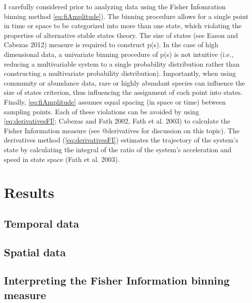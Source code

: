 \documentclass[12pt,twoside]{reedthesis}
\begin{document}
I carefully considered prior to analyzing data using the Fisher
Infomration binning method \eqref{eq:fiAmplitude}). The binning procedure
allows for a single point in time or space to be categorized into more
than one state, which violating the properties of alternative stable
states theory. The size of states (see Eason and Cabezas 2012) measure
is required to construct p(s). In the case of high dimensional data, a
univariate binning procedure of p(s) is not intuitive (i.e., reducing a
multivariable system to a single probability distribution rather than
constructing a multivariate probability distribution). Importantly, when
using community or abundance data, rare or highly abundant species can
influence the size of states criterion, thus influencing the assignment
of each point into states. Finally, \eqref{eq:fiAmplitude} assumes equal
spacing (in space or time) between sampling points. Each of these
violations can be avoided by using \eqref{eq:derivativesFI}; Cabezas and
Fath 2002, Fath et al. 2003) to calculate the Fisher Information measure
(see @derivatives for discussion on this topic). The derivatives method
(\eqref{eq:derivativesFI}) estimates the trajectory of the system's state
by calculating the integral of the ratio of the system's acceleration
and speed in state space (Fath et al. 2003).

\section{Results}\label{results-1}

\subsection{Temporal data}\label{temporal-data}

\subsection{Spatial data}\label{spatial-data}

\subsection{Interpreting the Fisher Information binning
measure}\label{interpreting-the-fisher-information-binning-measure}
\end{document}
